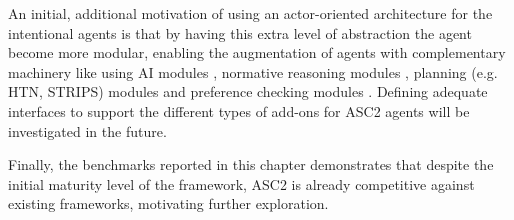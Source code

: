 An initial, additional motivation of using an actor-oriented architecture for the intentional agents is that by having this extra level of abstraction the agent become more modular, enabling the augmentation of agents with complementary machinery like using AI modules \cite{Singh2011IntegratingLI}, normative reasoning modules \cite{meneguzzi2009norm}, planning (e.g. HTN, STRIPS) modules \cite{meneguzzi_de_silva_2015} and preference checking modules \cite{Visser2016,Mohajeri2019}. Defining  adequate interfaces to support the different types of add-ons for ASC2 agents will be investigated in the future.

Finally, the benchmarks reported in this chapter demonstrates that despite the initial maturity level of the framework, ASC2 is already competitive against existing frameworks, motivating further exploration.


 
